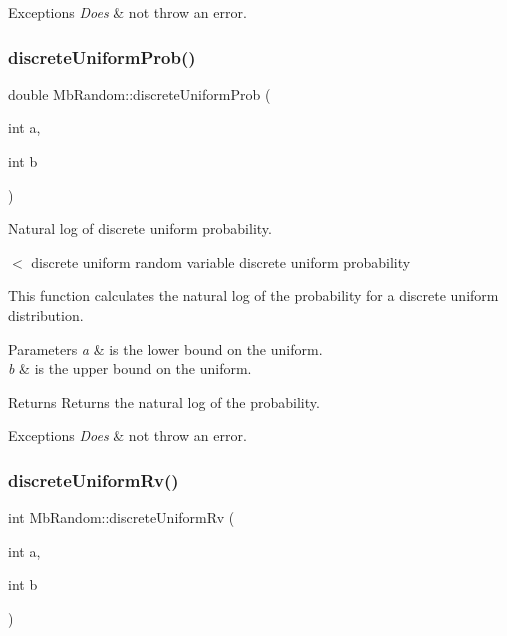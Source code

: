 \begin{DoxyExceptions}{Exceptions}
{\em Does} & not throw an error. \\
\hline
\end{DoxyExceptions}
\mbox{\label{class_mb_random_a59af6e67ee8e16ea0f0269ee803bb258}} 
\subsubsection{\texorpdfstring{discreteUniformProb()}{discreteUniformProb()}}
{\footnotesize\ttfamily double Mb\+Random\+::discrete\+Uniform\+Prob (\begin{DoxyParamCaption}\item[{int}]{a,  }\item[{int}]{b }\end{DoxyParamCaption})\hspace{0.3cm}{\ttfamily [inline]}}



Natural log of discrete uniform probability. 

$<$ discrete uniform random variable discrete uniform probability

This function calculates the natural log of the probability for a discrete uniform distribution.


\begin{DoxyParams}{Parameters}
{\em a} & is the lower bound on the uniform. \\
\hline
{\em b} & is the upper bound on the uniform. \\
\hline
\end{DoxyParams}
\begin{DoxyReturn}{Returns}
Returns the natural log of the probability. 
\end{DoxyReturn}

\begin{DoxyExceptions}{Exceptions}
{\em Does} & not throw an error. \\
\hline
\end{DoxyExceptions}
\mbox{\label{class_mb_random_a0088ae321ad8b45bc36b18ae9d4b2896}} 
\subsubsection{\texorpdfstring{discreteUniformRv()}{discreteUniformRv()}}
{\footnotesize\ttfamily int Mb\+Random\+::discrete\+Uniform\+Rv (\begin{DoxyParamCaption}\item[{int}]{a,  }\item[{int}]{b }\end{DoxyParamCaption})}




